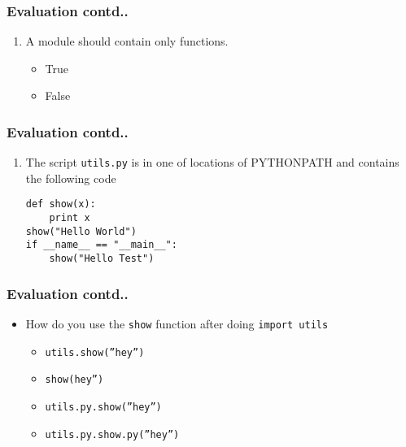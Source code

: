 \documentclass[17pt,compress]{beamer}
\newcounter{saveenumi}
\newcommand{\seti}{\setcounter{saveenumi}{\value{enumi}}}
\newcommand{\conti}{\setcounter{enumi}{\value{saveenumi}}}
\begin{document}
\begin{frame}
\frametitle{Evaluation contd..}
\label{sec-7.2}

\begin{enumerate}
\conti
\item A module should contain only functions.
\begin{itemize}
\item True
\item False
\end{itemize}
\seti
\end{enumerate}
\end{frame}
\begin{frame}[fragile]
\frametitle{Evaluation contd..}
\label{sec-8.1}

\begin{enumerate}
\conti
\item The script \texttt{utils.py} is in one of locations of PYTHONPATH and contains
    the following code\pause
\lstset{language=Python}
\begin{small}
\begin{lstlisting}
def show(x):
    print x
show("Hello World")
if __name__ == "__main__":
    show("Hello Test")
\end{lstlisting}
\end{small}
\end{enumerate}
\end{frame}
\begin{frame}[fragile]
\frametitle{Evaluation contd..}
\label{sec-8.2}

\begin{itemize}
\item How do you use the \texttt{show} function after doing \texttt{import utils}\pause
	\begin{itemize}
	\item \texttt{utils.show(''hey'')}
	\item \texttt{show(hey'')}
	\item \texttt{utils.py.show(''hey'')}
	\item \texttt{utils.py.show.py(''hey'')}
	\end{itemize}
\end{itemize}
\end{frame}
\end{document}
